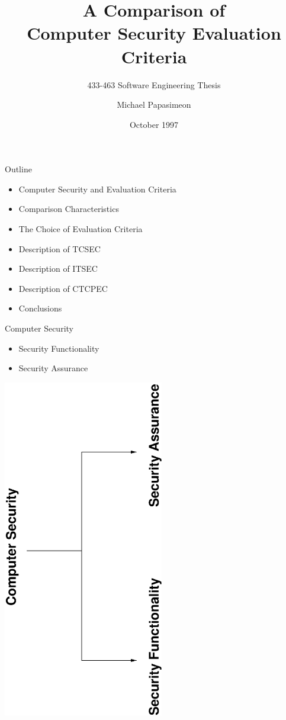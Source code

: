 \documentclass[xcolor=dvipsname,t]{beamer}
\title{A Comparison of \\Computer Security Evaluation Criteria}
\subtitle{433-463 Software Engineering Thesis}
\author{Michael Papasimeon}
\date{October 1997}
\begin{document}
\maketitle

\begin{frame}{Outline}
    \begin{itemize}
        \item Computer Security and Evaluation Criteria
        \item Comparison Characteristics
        \item The Choice of Evaluation Criteria
        \item Description of TCSEC
        \item Description of ITSEC
        \item Description of CTCPEC
        \item Conclusions
    \end{itemize}
\end{frame}

\begin{frame} {Computer Security}
    \begin{itemize}
        \item Security Functionality
        \item Security Assurance
    \end{itemize}
    \begin{center}
        \includegraphics[angle=-90, width=7cm]{tree.eps}
    \end{center}
\end{frame}
\end{document}
